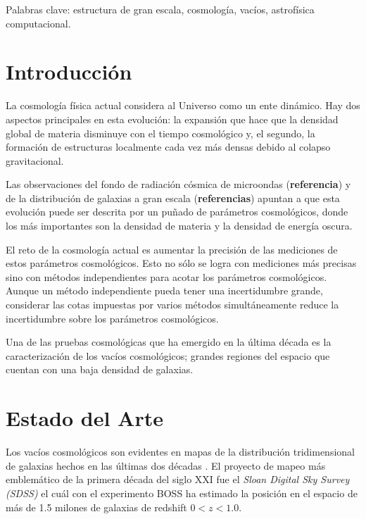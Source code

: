 \documentclass[preprint]{aastex62}
\begin{document}
  \medskip

  Palabras clave: estructura de gran escala, cosmología, vacíos,
  astrofísica computacional.


  \section{Introducción}

  La cosmolog\'ia f\'isica actual considera al Universo como un ente
  dinámico.  
  Hay dos aspectos principales en esta evoluci\'on: la expansi\'on que
  hace que la densidad global de materia disminuye
  con el tiempo cosmol\'ogico y, el segundo, la formaci\'on de
  estructuras localmente cada vez m\'as densas debido al colapso
  gravitacional. 

  Las observaciones del fondo de radiaci\'on c\'osmica de microondas
  ({\bf referencia}) y de la distribuci\'on de galaxias a gran escala
  ({\bf referencias}) apuntan a que esta evoluci\'on puede ser descrita
  por un pu\~nado de par\'ametros cosmol\'ogicos, donde los m\'as
  importantes son la densidad de materia y la densidad de energ\'ia
  oscura. 
  
  El reto de la cosmolog\'ia actual
  es aumentar la precisi\'on de las
  mediciones de estos par\'ametros cosmol\'ogicos. 
  Esto no s\'olo se logra con mediciones m\'as precisas sino con
  m\'etodos independientes para acotar los par\'ametros
  cosmol\'ogicos.
  Aunque un m\'etodo independiente pueda tener una incertidumbre
  grande, considerar las cotas impuestas por varios m\'etodos
  simult\'aneamente reduce la incertidumbre sobre los par\'ametros
  cosmol\'ogicos.

  Una de las pruebas cosmol\'ogicas que ha emergido en la \'ultima
  d\'ecada es la caracterizaci\'on de los vac\'ios cosmol\'ogicos;
  grandes regiones del espacio que cuentan con una baja densidad de
  galaxias. 


  

  \section{Estado del Arte}

Los vac\'ios cosmol\'ogicos son evidentes en mapas de la
distribuci\'on tridimensional de galaxias hechos en las \'ultimas dos
d\'ecadas \citep{SDSS-DR14-2017}.
El proyecto de mapeo más emblem\'atico de la primera década del
siglo XXI fue el \textit{Sloan Digital Sky Survey (SDSS)} el cu\'al
con el experimento BOSS ha estimado la posici\'on en el espacio de
más de 1.5 milones de galaxias de redshift $0<z<1.0$.
\end{document}
